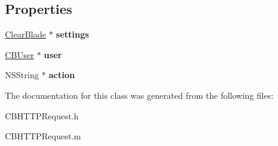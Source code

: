 \subsection*{Properties}
\begin{DoxyCompactItemize}
\item 
\hypertarget{interface_c_b_h_t_t_p_request_a7724199e4703f73b856f2ec2262e5735}{\hyperlink{interface_clear_blade}{Clear\+Blade} $\ast$ {\bfseries settings}}\label{interface_c_b_h_t_t_p_request_a7724199e4703f73b856f2ec2262e5735}

\item 
\hypertarget{interface_c_b_h_t_t_p_request_a8da1f5fa0eef6eef45d22eb694ae3039}{\hyperlink{interface_c_b_user}{C\+B\+User} $\ast$ {\bfseries user}}\label{interface_c_b_h_t_t_p_request_a8da1f5fa0eef6eef45d22eb694ae3039}

\item 
\hypertarget{interface_c_b_h_t_t_p_request_ad37d5f489778cda66ace537ee166cd8e}{N\+S\+String $\ast$ {\bfseries action}}\label{interface_c_b_h_t_t_p_request_ad37d5f489778cda66ace537ee166cd8e}

\end{DoxyCompactItemize}


The documentation for this class was generated from the following files\+:\begin{DoxyCompactItemize}
\item 
C\+B\+H\+T\+T\+P\+Request.\+h\item 
C\+B\+H\+T\+T\+P\+Request.\+m\end{DoxyCompactItemize}
